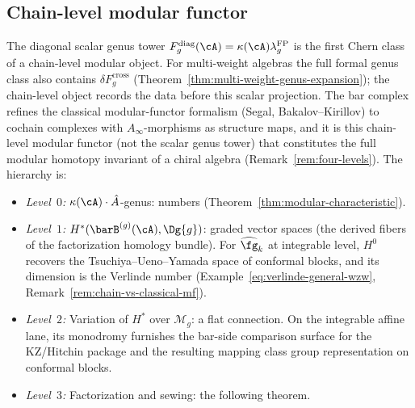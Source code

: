 \subsection{Chain-level modular functor}\label{subsec:chain-modular-functor}

The diagonal scalar genus tower
$F_g^{\mathrm{diag}}(\cA)=\kappa(\cA)\lambda_g^{\mathrm{FP}}$
is the first Chern class of a chain-level modular object.
For multi-weight algebras the full formal genus class also contains
$\delta F_g^{\mathrm{cross}}$ (Theorem~\ref{thm:multi-weight-genus-expansion});
the chain-level object records the data before this scalar projection.
The bar complex refines the classical modular-functor
formalism (Segal, Bakalov--Kirillov) to cochain complexes with
$A_\infty$-morphisms as structure maps, and it is this
chain-level modular functor (not the scalar genus tower) that
constitutes the full modular homotopy invariant of a chiral
algebra (Remark~\ref{rem:four-levels}).
The hierarchy is:
\begin{itemize}
\item \emph{Level~$0$:}
 $\kappa(\cA) \cdot \hat{A}$-genus: numbers
 (Theorem~\ref{thm:modular-characteristic}).
\item \emph{Level~$1$:}
 $H^*(\barB^{(g)}(\cA), \Dg{g})$: graded vector spaces
 (the derived fibers of the factorization homology bundle).
 For $\widehat{\fg}_k$ at integrable level, $H^0$ recovers
 the Tsuchiya--Ueno--Yamada space of conformal blocks, and
 its dimension is the Verlinde number
 (Example~\ref{eq:verlinde-general-wzw}, Remark~\ref{rem:chain-vs-classical-mf}).
\item \emph{Level~$2$:}
 Variation of $H^*$ over $\mathcal{M}_g$: a flat connection.
 On the integrable affine lane, its monodromy furnishes the
 bar-side comparison surface for the KZ/Hitchin package and
 the resulting mapping class group representation on conformal blocks.
\item \emph{Level~$3$:}
 Factorization and sewing: the following theorem.
\end{itemize}

